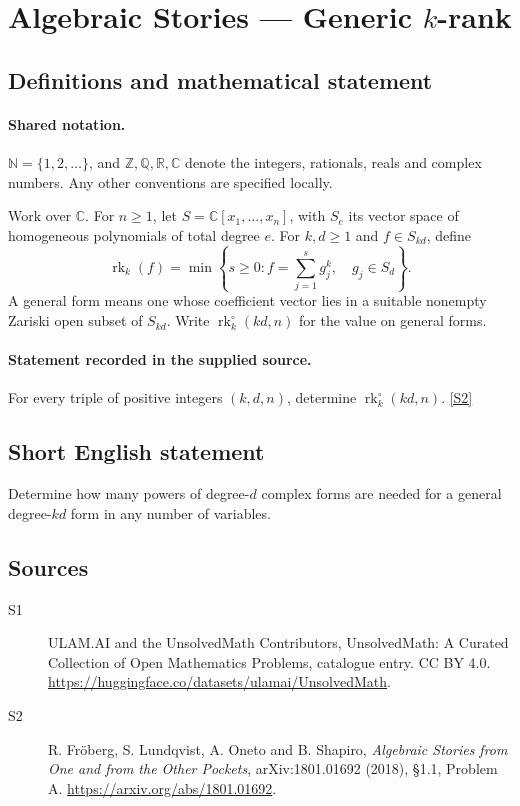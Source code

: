 \documentclass[11pt]{article}
\newcommand{\sref}[2]{\hyperlink{source:#1:#2}{[S#2]}}
\begin{document}
\section{Algebraic Stories — Generic $k$-rank}\label{statement}

\subsection{Definitions and mathematical statement}

\paragraph{Shared notation.}$\mathbb N=\{1,2,\ldots\}$, and $\mathbb Z,\mathbb Q,\mathbb R,\mathbb C$ denote the integers, rationals, reals and complex numbers. Any other conventions are specified locally.


Work over $\mathbb C$. For $n\geq1$, let $S=\mathbb C[x_1,\ldots,x_n]$, with $S_e$ its vector space of homogeneous polynomials of total degree $e$. For $k,d\geq1$ and $f\in S_{kd}$, define
\[\operatorname{rk}_k(f)=\min\left\{s\geq0:f=\sum_{j=1}^{s}g_j^k,\quad g_j\in S_d\right\}.
\]
A general form means one whose coefficient vector lies in a suitable nonempty Zariski open subset of $S_{kd}$. Write $\operatorname{rk}_k^\circ(kd,n)$ for the value on general forms.
\paragraph{Statement recorded in the supplied source.}
For every triple of positive integers $(k,d,n)$, determine $\operatorname{rk}_k^\circ(kd,n)$. \sref{statement}{2}
\subsection{Short English statement}
Determine how many powers of degree-$d$ complex forms are needed for a general degree-$kd$ form in any number of variables.
\subsection{Sources}
\begin{description}
\item[\hypertarget{source:statement:1}{S1}] ULAM.AI and the UnsolvedMath Contributors, UnsolvedMath: A Curated Collection of Open Mathematics Problems, catalogue entry. CC BY 4.0. \url{https://huggingface.co/datasets/ulamai/UnsolvedMath}.
\item[\hypertarget{source:statement:2}{S2}] R. Fröberg, S. Lundqvist, A. Oneto and B. Shapiro, \emph{Algebraic Stories from One and from the Other Pockets}, arXiv:1801.01692 (2018), §1.1, Problem A. \url{https://arxiv.org/abs/1801.01692}.
\end{description}
\label{end:statement}
\end{document}
